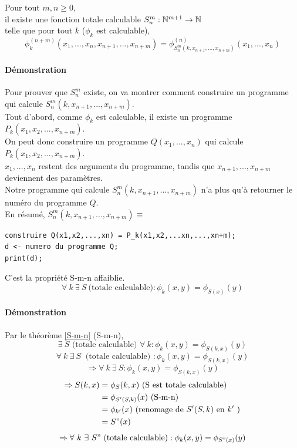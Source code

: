 \begin{mytheo}[S-m-n] 
	\label{S-m-n}Pour tout $m,n \geq 0$, \\
	il existe une fonction totale calculable $S^m_n : \mathbb{N}^{m+1} \rightarrow 
	\mathbb{N}$ \\
	telle que pour tout $k$ ($\phi_k$ est calculable),
	$$ \phi^{(n+m)}_k(x_1,...,x_n,x_{n+1},...,x_{n+m}) = 
	\phi^{(n)}_{S^m_n(k,x_{n+1}, ...,x_{n+m})} (x_1,...,x_n)$$
\end{mytheo}

\paragraph{Démonstration}
	Pour prouver que $S^m_n$ existe, on va montrer comment construire un programme qui 
	calcule  $S^m_n(k,x_{n+1}, ...,x_{n+m})$.\\
	Tout d'abord, comme $\phi_k$ est calculable, il existe un programme  
	$P_k(x_1,x_2,...,x_{n+m})$.\\
	On peut donc construire un programme $Q(x_1,...,x_n)$ qui calcule 
	$P_k(x_1,x_2,...,x_{n+m})$.\\
	$x_1,...,x_n$ restent des arguments du programme,
	tandis que $x_{n+1},...,x_{n+m}$ deviennent des paramètres.\\
	Notre programme qui calcule $S^m_n(k,x_{n+1}, ...,x_{n+m})$ n'a plus 
	qu'à retourner le numéro du programme $Q$.\\
       	En résumé, $S^m_n(k,x_{n+1},
	...,x_{n+m}) \equiv$
	\begin{lstlisting}
construire Q(x1,x2,...,xn) = P_k(x1,x2,...xn,...,xn+m);
d <- numero du programme Q;
print(d);
	\end{lstlisting}

\begin{mytheo}[S]
	C'est la propriété S-m-n affaiblie.
	\[ \forall \ k \ \exists \ S \ \text{(totale calculable)} : \phi_k(x,y)=\phi_{S(x)}(y)\]
\end{mytheo}

\paragraph{Démonstration}
	Par le théorème \ref{S-m-n} (S-m-n),
	\[ \exists \ S \text{ (totale calculable) } \forall \ k : \phi_k(x,y)=\phi_{S(k,x)}(y)\]
	\[ \forall \ k \ \exists \ S \ \text{ (totale calculable) } : \phi_k(x,y)=\phi_{S(k,x)}(y)\]
	\[ \Rightarrow \forall \ k \ \exists \ S : \phi_k(x,y) =\phi_{S(k,x)}(y) \]
	\begin{align}
		\Rightarrow S(k,x) &= \phi_{S}(k,x) \text{ (S est totale calculable)}\\
		&= \phi_{S'(S,k)}(x) \text{ (S-m-n)}\\
		&= \phi_{k'}(x) \text{ (renomage de } S'(S,k) \text{ en } k' \text{ )}\\
		&= S"(x)
	\end{align}
	\[ \Rightarrow \forall \ k \ \exists \ S" \ \text{(totale calculable)} :
       	\phi_k(x,y)=\phi_{S"(x)}(y)\]

